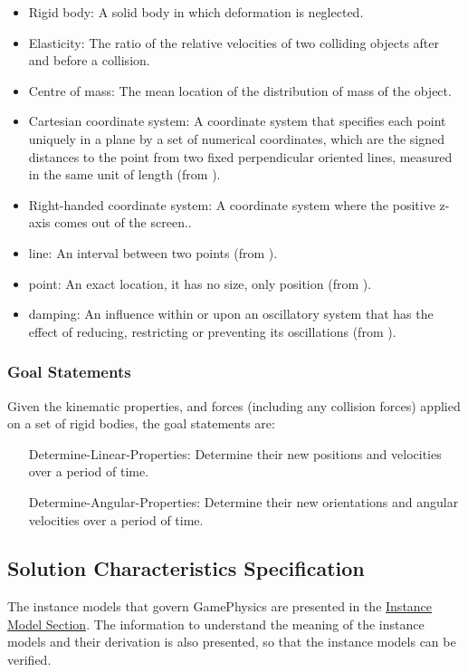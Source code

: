 \documentclass[12pt]{article}
\begin{document}
\begin{itemize}
\item{Rigid body: A solid body in which deformation is neglected.}
\item{Elasticity: The ratio of the relative velocities of two colliding objects after and before a collision.}
\item{Centre of mass: The mean location of the distribution of mass of the object.}
\item{Cartesian coordinate system: A coordinate system that specifies each point uniquely in a plane by a set of numerical coordinates, which are the signed distances to the point from two fixed perpendicular oriented lines, measured in the same unit of length (from \cite{cartesianWiki}).}
\item{Right-handed coordinate system: A coordinate system where the positive z-axis comes out of the screen..}
\item{line: An interval between two points (from \cite{lineSource}).}
\item{point: An exact location, it has no size, only position (from \cite{pointSource}).}
\item{damping: An influence within or upon an oscillatory system that has the effect of reducing, restricting or preventing its oscillations (from \cite{dampingSource}).}
\end{itemize}
\subsubsection{Goal Statements}
\label{Sec:GoalStmt}
Given the kinematic properties, and forces (including any collision forces) applied on a set of rigid bodies, the goal statements are:

\begin{itemize}
\item[Determine-Linear-Properties:\phantomsection\label{linearGS}]{Determine their new positions and velocities over a period of time.}
\item[Determine-Angular-Properties:\phantomsection\label{angularGS}]{Determine their new orientations and angular velocities over a period of time.}
\end{itemize}
\subsection{Solution Characteristics Specification}
\label{Sec:SolCharSpec}
The instance models that govern GamePhysics are presented in the \hyperref[Sec:IMs]{Instance Model Section}. The information to understand the meaning of the instance models and their derivation is also presented, so that the instance models can be verified.
\end{document}
